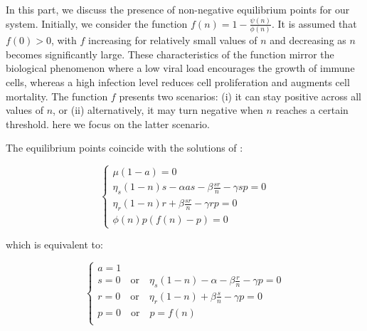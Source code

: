 In this part, we discuss the presence of non-negative equilibrium points for our system. Initially, we consider the function $f(n) = 1 - \frac{\psi(n)}{\phi(n)}$. It is assumed that $f(0)>0$, with $f$ increasing for relatively small values of $n$ and decreasing as $n$ becomes significantly large. These characteristics of the function mirror the biological phenomenon where a low viral load encourages the growth of immune
cells, whereas a high infection level reduces cell proliferation and augments cell mortality. The function $f$ presents two scenarios:
(i) it can stay positive across all values of $n$, or (ii) alternatively, it may turn negative when $n$ reaches a certain threshold. here we focus on the latter scenario.

The equilibrium points coincide with the solutions of :

\begin{equation}
	\begin{cases}
		 \mu(1 - a)  = 0 \\
		 \eta_s(1 - n)s - \alpha as - \beta \frac{sr}{n} - \gamma sp = 0 \\
		 \eta_r(1 - n)r + \beta \frac{sr}{n} - \gamma rp = 0 \\
		 \phi(n)p(f(n) -p ) = 0 
	\end{cases}
\end{equation}

which is equivalent to:

\begin{equation}
	\begin{cases}
		a = 1 \\
		s = 0 \quad \text{or} \quad \eta_s(1-n) - \alpha - \beta\frac{r}{n} -\gamma p =0 \\
		r = 0 \quad \text{or} \quad \eta_r(1-n) + \beta\frac{s}{n} -\gamma p =0 \\
		p = 0 \quad \text{or} \quad p = f(n) \\
	\end{cases}
\end{equation}

